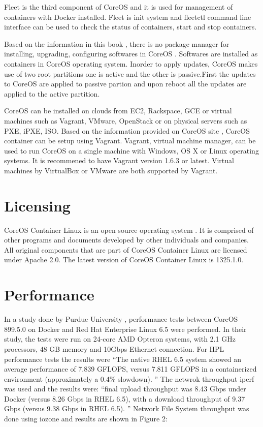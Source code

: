 \documentclass[9pt,twocolumn,twoside]{styles/osajnl}
\begin{document}
Fleet is the third component of CoreOS and it is used for management
of containers with Docker installed. Fleet is init system and fleetctl
command line interface can be used to check the status of containers,
start and stop containers.\cite{www-coreOSquickstart}

Based on the information in this book \cite{coreOSBook}, there is no package
manager for installing, upgrading, configuring softwares in CoreOS
. Softwares are installed as containers in CoreOS operating
system. Inorder to apply updates, CoreOS makes use of two root
partitions one is active and the other is passive.First the updates to
CoreOS are applied to passive partion and upon reboot all the updates
are applied to the active partition.

CoreOS can be installed on clouds from EC2, Rackspace, GCE or virtual
machines such as Vagrant, VMware, OpenStack or on physical servers
such as PXE, iPXE, ISO. \cite{www-coreOSquickstart}Based on the
information provided on CoreOS site \cite{www-coreOSvagrant}, CoreOS
container can be setup using Vagrant. Vagrant, virtual machine
manager, can be used to run CoreOS on a single machine with Windows,
OS X or Linux operating systems. It is recommened to have Vagrant
version 1.6.3 or latest. Virtual machines by VirtualBox or VMware are
both supported by Vagrant.

\section{Licensing}

CoreOS Container Linux is an open source operating system . It is
comprised of other programs and documents developed by other
individuals and companies. All original components that are part of
CoreOS Container Linux are licensed under Apache 2.0.  The latest
version of CoreOS Container Linux is 1325.1.0. \cite{www-core}


\section{Performance}

In a study done by Purdue University \cite{julian2016containers} ,
performance tests between CoreOS 899.5.0 on Docker and Red Hat
Enterprise Linux 6.5 were performed. In their study, the tests were
run on 24-core AMD Opteron systems, with 2.1 GHz processors, 48 GB
memory and 10Gbps Ethernet connection.  For HPL performance tests the
results were “The native RHEL 6.5 system showed an average performance
of 7.839 GFLOPS, versus 7.811 GFLOPS in a containerized environment
(approximately a 0.4\% slowdown). ” The netwrok throughput iperf was
used and the results were: “final upload throughput was 8.43 Gbps
under Docker (versus 8.26 Gbps in RHEL 6.5), with a download
throughput of 9.37 Gbps (versus 9.38 Gbps in RHEL 6.5). ” Network File
System throughput was done using iozone and results are shown in
Figure 2:
\end{document}

